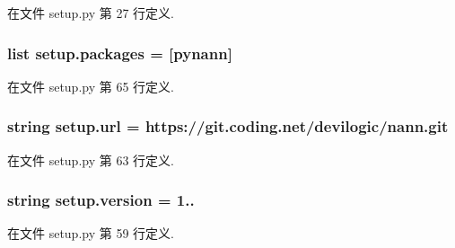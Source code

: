 在文件 setup.\+py 第 27 行定义.

\hypertarget{namespacesetup_aada4406eeab94f62c5f72fee617f0b82}{}
\subsubsection[{packages}]{\setlength{\rightskip}{0pt plus 5cm}list setup.\+packages = \mbox{[}\textquotesingle{}pynann\textquotesingle{}\mbox{]}}\label{namespacesetup_aada4406eeab94f62c5f72fee617f0b82}


在文件 setup.\+py 第 65 行定义.

\hypertarget{namespacesetup_a3376e8b9735800b5b9e455914cee908d}{}
\subsubsection[{url}]{\setlength{\rightskip}{0pt plus 5cm}string setup.\+url = \textquotesingle{}https\+://git.\+coding.\+net/devilogic/nann.\+git\textquotesingle{}}\label{namespacesetup_a3376e8b9735800b5b9e455914cee908d}


在文件 setup.\+py 第 63 行定义.

\hypertarget{namespacesetup_ab177531e7a80674a3db3de2d79eb8be7}{}
\subsubsection[{version}]{\setlength{\rightskip}{0pt plus 5cm}string setup.\+version = \textquotesingle{}1..\textquotesingle{}}\label{namespacesetup_ab177531e7a80674a3db3de2d79eb8be7}


在文件 setup.\+py 第 59 行定义.

